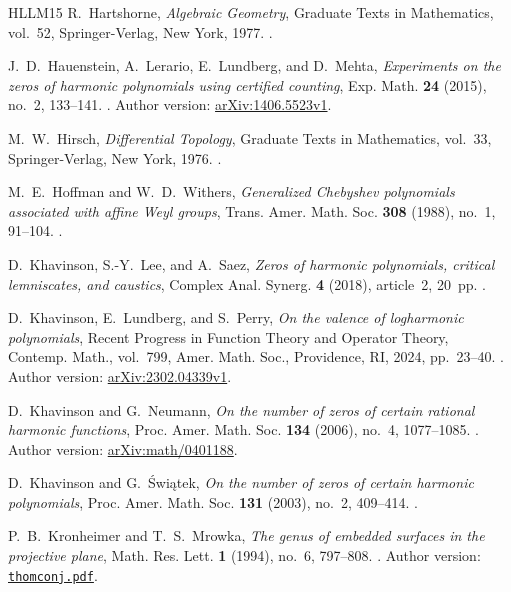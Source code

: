 \documentclass[UTF8,11pt]{ctexart}
\theoremstyle{definition}
\numberwithin{equation}{section}
\begin{document}
\begin{thebibliography}{HLLM15}
R.~Hartshorne,
\emph{Algebraic Geometry},
Graduate Texts in Mathematics, vol.~52, Springer-Verlag, New York, 1977.
.

J.~D.~Hauenstein, A.~Lerario, E.~Lundberg, and D.~Mehta,
\emph{Experiments on the zeros of harmonic polynomials using certified counting},
Exp. Math. \textbf{24} (2015), no.~2, 133--141.
.
Author version: \href{https://arxiv.org/abs/1406.5523v1}{arXiv:1406.5523v1}.

M.~W.~Hirsch,
\emph{Differential Topology},
Graduate Texts in Mathematics, vol.~33, Springer-Verlag, New York, 1976.
.

M.~E.~Hoffman and W.~D.~Withers,
\emph{Generalized Chebyshev polynomials associated with affine Weyl groups},
Trans. Amer. Math. Soc. \textbf{308} (1988), no.~1, 91--104.
.

D.~Khavinson, S.-Y.~Lee, and A.~Saez,
\emph{Zeros of harmonic polynomials, critical lemniscates, and caustics},
Complex Anal. Synerg. \textbf{4} (2018), article~2, 20~pp.
.

D.~Khavinson, E.~Lundberg, and S.~Perry,
\emph{On the valence of logharmonic polynomials},
Recent Progress in Function Theory and Operator Theory,
Contemp. Math., vol.~799, Amer. Math. Soc., Providence, RI, 2024, pp.~23--40.
.
Author version: \href{https://arxiv.org/abs/2302.04339v1}{arXiv:2302.04339v1}.

D.~Khavinson and G.~Neumann,
\emph{On the number of zeros of certain rational harmonic functions},
Proc. Amer. Math. Soc. \textbf{134} (2006), no.~4, 1077--1085.
.
Author version: \href{https://arxiv.org/abs/math/0401188}{arXiv:math/0401188}.

D.~Khavinson and G.~\'{S}wi\k{a}tek,
\emph{On the number of zeros of certain harmonic polynomials},
Proc. Amer. Math. Soc. \textbf{131} (2003), no.~2, 409--414.
.

P.~B.~Kronheimer and T.~S.~Mrowka,
\emph{The genus of embedded surfaces in the projective plane},
Math. Res. Lett. \textbf{1} (1994), no.~6, 797--808.
.
Author version: \href{https://people.math.harvard.edu/~kronheim/thomconj.pdf}
{\texttt{thomconj.pdf}}.


\end{thebibliography}
\end{document}
